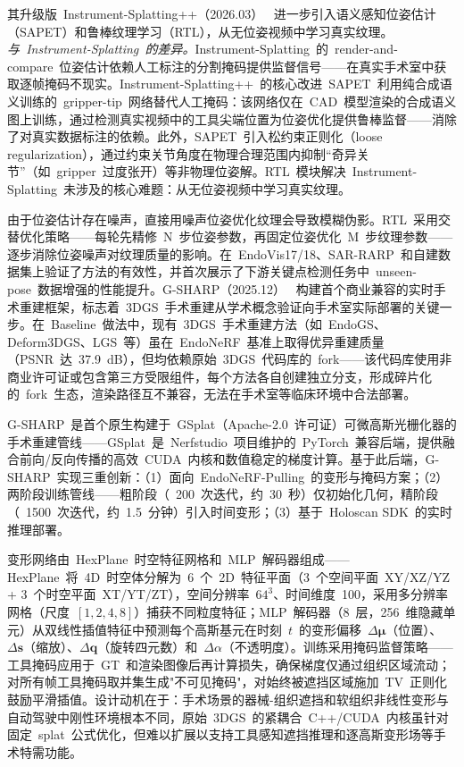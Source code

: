 其升级版~Instrument-Splatting++（2026.03）~\cite{2603_22792} 进一步引入语义感知位姿估计（SAPET）和鲁棒纹理学习（RTL），从无位姿视频中学习真实纹理。\textit{与~Instrument-Splatting~的差异。}Instrument-Splatting~的~render-and-compare~位姿估计依赖人工标注的分割掩码提供监督信号——在真实手术室中获取逐帧掩码不现实。Instrument-Splatting++~的核心改进~SAPET~利用纯合成语义训练的~gripper-tip~网络替代人工掩码：该网络仅在~CAD~模型渲染的合成语义图上训练，通过检测真实视频中的工具尖端位置为位姿优化提供鲁棒监督——消除了对真实数据标注的依赖。此外，SAPET~引入松约束正则化（loose regularization），通过约束关节角度在物理合理范围内抑制``奇异关节''（如~gripper~过度张开）等非物理位姿解。RTL~模块解决~Instrument-Splatting~未涉及的核心难题：从无位姿视频中学习真实纹理。

由于位姿估计存在噪声，直接用噪声位姿优化纹理会导致模糊伪影。RTL~采用交替优化策略——每轮先精修~N~步位姿参数，再固定位姿优化~M~步纹理参数——逐步消除位姿噪声对纹理质量的影响。在~EndoVis17/18、SAR-RARP~和自建数据集上验证了方法的有效性，并首次展示了下游关键点检测任务中~unseen-pose~数据增强的性能提升。G-SHARP（2025.12）~\cite{2512_02482} 构建首个商业兼容的实时手术重建框架，标志着~3DGS~手术重建从学术概念验证向手术室实际部署的关键一步。在~Baseline~做法中，现有~3DGS~手术重建方法（如~EndoGS、Deform3DGS、LGS~等）虽在~EndoNeRF~基准上取得优异重建质量（PSNR~达~37.9~dB），但均依赖原始~3DGS~代码库的~fork——该代码库使用非商业许可证或包含第三方受限组件，每个方法各自创建独立分支，形成碎片化的~fork~生态，渲染路径互不兼容，无法在手术室等临床环境中合法部署。

G-SHARP~是首个原生构建于~GSplat（Apache-2.0~许可证）可微高斯光栅化器的手术重建管线——GSplat~是~Nerfstudio~项目维护的~PyTorch~兼容后端，提供融合前向/反向传播的高效~CUDA~内核和数值稳定的梯度计算。基于此后端，G-SHARP~实现三重创新：（1）面向~EndoNeRF-Pulling~的变形与掩码方案；（2）两阶段训练管线——粗阶段（~200~次迭代，约~30~秒）仅初始化几何，精阶段（~1500~次迭代，约~1.5~分钟）引入时间变形；（3）基于~Holoscan SDK~的实时推理部署。

变形网络由~HexPlane~时空特征网格和~MLP~解码器组成——HexPlane~将~4D~时空体分解为~6~个~2D~特征平面（3~个空间平面~XY/XZ/YZ + 3~个时空平面~XT/YT/ZT），空间分辨率~$64^3$、时间维度~100，采用多分辨率网格（尺度~$[1,2,4,8]$）捕获不同粒度特征；MLP~解码器（8~层，256~维隐藏单元）从双线性插值特征中预测每个高斯基元在时刻~$t$~的变形偏移~$\Delta\bm{\mu}$（位置）、$\Delta\bm{s}$（缩放）、$\Delta\bm{q}$（旋转四元数）和~$\Delta\alpha$（不透明度）。训练采用掩码监督策略——工具掩码应用于~GT~和渲染图像后再计算损失，确保梯度仅通过组织区域流动；对所有帧工具掩码取并集生成"不可见掩码"，对始终被遮挡区域施加~TV~正则化鼓励平滑插值。设计动机在于：手术场景的器械-组织遮挡和软组织非线性变形与自动驾驶中刚性环境根本不同，原始~3DGS~的紧耦合~C++/CUDA~内核虽针对固定~splat~公式优化，但难以扩展以支持工具感知遮挡推理和逐高斯变形场等手术特需功能。

